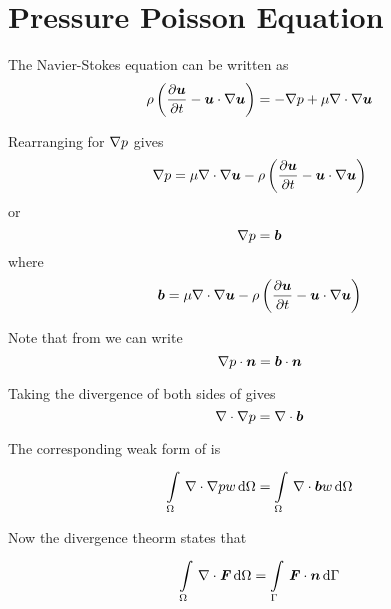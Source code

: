 \section{Pressure Poisson Equation}

The Navier-Stokes equation can be written as
\begin{equation}
  \rho\pbrac{\delby{\vectr{u}}{t}-\dotprod{\vectr{u}}{\gradient{}{\vectr{u}}}}=-\gradient{}{p}+\mu\divergence{}{\gradient{}{\vectr{u}}}
  \label{eqn:NavierStokes}
\end{equation}

Rearranging for $\gradient{}{p}$ gives
\begin{equation}
  \gradient{}{p}=\mu\divergence{}{\gradient{}{\vectr{u}}}-\rho\pbrac{\delby{\vectr{u}}{t}-\dotprod{\vectr{u}}{\gradient{}{\vectr{u}}}}  
\end{equation}
or
\begin{equation}
  \gradient{}{p}=\vectr{b}
  \label{eqn:NavierStokesPressureForm}
\end{equation}
where
\begin{equation}
  \vectr{b}=\mu\divergence{}{\gradient{}{\vectr{u}}}-\rho\pbrac{\delby{\vectr{u}}{t}-\dotprod{\vectr{u}}{\gradient{}{\vectr{u}}}}
\end{equation}

Note that from  we can write
\begin{equation} 
  \dotprod{\gradient{}{p}}{\normal}=\dotprod{\vectr{b}}{\normal}
  \label{eqn:NavierStokesPressureFormNormal}
\end{equation}

Taking the divergence of both sides of  gives
\begin{equation}
  \divergence{}{\gradient{}{p}}=\divergence{}{\vectr{b}}
  \label{eqn:PressurePoisson}
\end{equation}

The corresponding weak form of  is
\begin{equation}
  \gint{\Omega}{}{\divergence{}{\gradient{}{p}}w}{\Omega}=\gint{\Omega}{}{\divergence{}{\vectr{b}}w}{\Omega}
  \label{eqn:PressurePoissonWeakForm}
\end{equation}

Now the divergence theorm states that
\begin{equation}
  \gint{\Omega}{}{\divergence{}{\tensor{F}}}{\Omega}=\gint{\Gamma}{}{\dotprod{\tensor{F}}{\normal}}{\Gamma}
  \label{eqn:DivergenceTheorm}
\end{equation}

